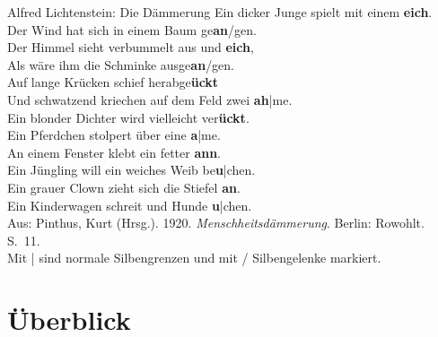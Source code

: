 \begin{frame}
  {Alfred Lichtenstein: Die Dämmerung}
  \pause
  \small
  Ein dicker Junge spielt mit einem \textbf{\alert<3>{eich}}.\\
  Der Wind hat sich in einem Baum ge\textbf{\alert<4>{an}}/gen.\\
  Der Himmel sieht verbummelt aus und \textbf{\alert<3>{eich}},\\
  Als wäre ihm die Schminke ausge\textbf{\alert<4>{an}}/gen.\\
  \Zeile
  Auf lange Krücken schief herabge\textbf{\alert<5>{ückt}}\\
  Und schwatzend kriechen auf dem Feld zwei \textbf{\alert<6>{ah}}|me.\\
  Ein blonder Dichter wird vielleicht ver\textbf{\alert<5>{ückt}}.\\
  Ein Pferdchen stolpert über eine \textbf{\alert<6>{a}}|me.\\
  \Zeile
  An einem Fenster klebt ein fetter \textbf{\alert<7>{ann}}.\\
  Ein Jüngling will ein weiches Weib be\textbf{\alert<8>{u}}|chen.\\
  Ein grauer Clown zieht sich die Stiefel \textbf{\alert<7>{an}}.\\
  Ein Kinderwagen schreit und Hunde \textbf{\alert<8>{u}}|chen.\\
  \Zeile
  \footnotesize
  Aus: Pinthus, Kurt (Hrsg.). 1920. \textit{Menschheitsdämmerung}. Berlin: Rowohlt. S.~11.\\
  Mit | sind normale Silbengrenzen und mit / Silbengelenke markiert.
\end{frame}


\section{Überblick}

